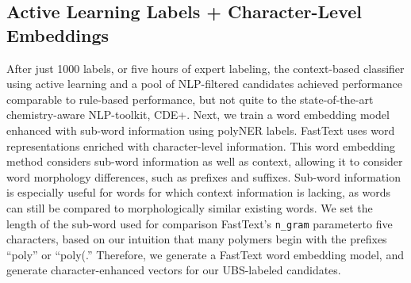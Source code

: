 \subsection{Active Learning Labels + Character-Level Embeddings}
After just 1000 labels, or five hours of expert labeling, the context-based classifier using active learning and a pool of NLP-filtered candidates achieved performance comparable to rule-based performance, 
but not quite to the state-of-the-art chemistry-aware NLP-toolkit, CDE+.
Next, we train a word embedding model enhanced with sub-word information using polyNER labels. 
FastText uses word representations enriched with character-level information.
This word embedding method considers sub-word information as well as
context, allowing it to consider word morphology differences, such as prefixes
and suffixes. Sub-word information is especially useful for words for which
context information is lacking, as words can still be compared to morphologically similar
existing words. We set the length of the sub-word used for comparison\textemdash
FastText's \texttt{n_gram} parameter\textemdash to five characters, based on our intuition that
many polymers begin with the prefixes ``poly'' or ``poly(.'' 
Therefore, we generate a FastText word embedding model, 
and generate character-enhanced vectors for our UBS-labeled candidates.

